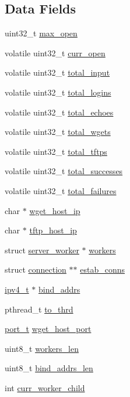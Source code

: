 \subsection*{Data Fields}
\begin{DoxyCompactItemize}
\item 
uint32\+\_\+t \hyperlink{structserver_abea44b0a054946db9343b7af424d143c}{max\+\_\+open}
\item 
volatile uint32\+\_\+t \hyperlink{structserver_a86e24d82855089d55604d963f461c68b}{curr\+\_\+open}
\item 
volatile uint32\+\_\+t \hyperlink{structserver_a6272db0d7f3ee3172f5908fc6c53f52c}{total\+\_\+input}
\item 
volatile uint32\+\_\+t \hyperlink{structserver_a775d7dfa5b4752f9de7d4b1a4f848562}{total\+\_\+logins}
\item 
volatile uint32\+\_\+t \hyperlink{structserver_a5dc4c264e773d0bada48651a52c59c47}{total\+\_\+echoes}
\item 
volatile uint32\+\_\+t \hyperlink{structserver_aba6bc4241f091f9fe65a221e47fcae4f}{total\+\_\+wgets}
\item 
volatile uint32\+\_\+t \hyperlink{structserver_a366af7f3a5ea2f51a94717763cc60533}{total\+\_\+tftps}
\item 
volatile uint32\+\_\+t \hyperlink{structserver_a4077e0ba638cb87bfaa0412929cd8cf6}{total\+\_\+successes}
\item 
volatile uint32\+\_\+t \hyperlink{structserver_a9876401c17a01e030d0d1c0cccb081b3}{total\+\_\+failures}
\item 
char $\ast$ \hyperlink{structserver_ad37424a0d9627326449581b932597c1d}{wget\+\_\+host\+\_\+ip}
\item 
char $\ast$ \hyperlink{structserver_a084b7a7e8a34f91c71fa99a1985f8e3a}{tftp\+\_\+host\+\_\+ip}
\item 
struct \hyperlink{structserver__worker}{server\+\_\+worker} $\ast$ \hyperlink{structserver_a3dd96237dccb83d96d674007e2cef801}{workers}
\item 
struct \hyperlink{structconnection}{connection} $\ast$$\ast$ \hyperlink{structserver_aa7312b497a8b28d32a2f854e73564342}{estab\+\_\+conns}
\item 
\hyperlink{loader_2src_2headers_2includes_8h_aaadf2e480fd246ff9e932039b223baed}{ipv4\+\_\+t} $\ast$ \hyperlink{structserver_a8a3fd504da6b2635eba92ed2e3c53b17}{bind\+\_\+addrs}
\item 
pthread\+\_\+t \hyperlink{structserver_a672086e622555f69db447ee87ffb0dee}{to\+\_\+thrd}
\item 
\hyperlink{loader_2src_2headers_2includes_8h_adccb5337cf206fe3eca7c4732f634bb9}{port\+\_\+t} \hyperlink{structserver_a485e81def97a840a7f0ee2635e46bf07}{wget\+\_\+host\+\_\+port}
\item 
uint8\+\_\+t \hyperlink{structserver_ab76231f9ee81a6400b7ac02155895274}{workers\+\_\+len}
\item 
uint8\+\_\+t \hyperlink{structserver_a9b4b0a9ca9692a41f452b322803adea4}{bind\+\_\+addrs\+\_\+len}
\item 
int \hyperlink{structserver_a47a6e54254224e795f4fea558dcfbc3a}{curr\+\_\+worker\+\_\+child}
\end{DoxyCompactItemize}



